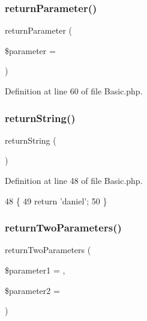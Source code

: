\subsubsection{\texorpdfstring{return\+Parameter()}{returnParameter()}}
{\footnotesize\ttfamily return\+Parameter (\begin{DoxyParamCaption}\item[{}]{\$parameter = {\ttfamily \textquotesingle{}\textquotesingle{}} }\end{DoxyParamCaption})}



Definition at line 60 of file Basic.\+php.


\hypertarget{class_basic_a5bb666dcea19a9561c2047cfa25936bd}{}\label{class_basic_a5bb666dcea19a9561c2047cfa25936bd} 
\subsubsection{\texorpdfstring{return\+String()}{returnString()}}
{\footnotesize\ttfamily return\+String (\begin{DoxyParamCaption}{ }\end{DoxyParamCaption})}



Definition at line 48 of file Basic.\+php.


\begin{DoxyCode}
48                                    \{
49         \textcolor{keywordflow}{return} \textcolor{stringliteral}{'daniel'};
50     \}
\end{DoxyCode}
\hypertarget{class_basic_a2ef87b96abcca966a41e34d077fcc38e}{}\label{class_basic_a2ef87b96abcca966a41e34d077fcc38e} 
\subsubsection{\texorpdfstring{return\+Two\+Parameters()}{returnTwoParameters()}}
{\footnotesize\ttfamily return\+Two\+Parameters (\begin{DoxyParamCaption}\item[{}]{\$parameter1 = {\ttfamily \textquotesingle{}\textquotesingle{}},  }\item[{}]{\$parameter2 = {\ttfamily \textquotesingle{}\textquotesingle{}} }\end{DoxyParamCaption})}




